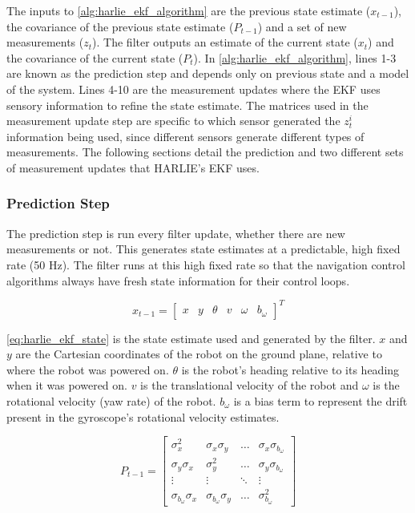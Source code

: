 The inputs to \autoref{alg:harlie_ekf_algorithm} are the previous state estimate ($x_{t-1}$), the covariance of the previous state estimate ($P_{t-1}$) and a set of new measurements ($z_t$). The filter outputs an estimate of the current state ($x_t$) and the covariance of the current state ($P_t$). In \autoref{alg:harlie_ekf_algorithm}, lines 1-3 are known as the prediction step and depends only on previous state and a model of the system. Lines 4-10 are the measurement updates where the EKF uses sensory information to refine the state estimate. The matrices used in the measurement update step are specific to which sensor generated the $z^i_t$ information being used, since different sensors generate different types of measurements. The following sections detail the prediction and two different sets of measurement updates that HARLIE's EKF uses.

\subsubsection{Prediction Step}\label{subsubsec:harlie_ekf_prediction}

The prediction step is run every filter update, whether there are new measurements or not. This generates state estimates at a predictable, high fixed rate (50 Hz). The filter runs at this high fixed rate so that the navigation control algorithms always have fresh state information for their control loops.

\begin{equation}
	x_{t-1} = 
	\begin{bmatrix}
		x &
		y &
		\theta &
		v &
		\omega &
		b_{\omega}
	\end{bmatrix}^T
	\label{eq:harlie_ekf_state}
\end{equation}

\eqref{eq:harlie_ekf_state} is the state estimate used and generated by the filter. $x$ and $y$ are the Cartesian coordinates of the robot on the ground plane, relative to where the robot was powered on. $\theta$ is the robot's heading relative to its heading when it was powered on. $v$ is the translational velocity of the robot and $\omega$ is the rotational velocity (yaw rate) of the robot. $b_{\omega}$ is a bias term to represent the drift present in the gyroscope's rotational velocity estimates.

\begin{equation}
	P_{t-1} =
	\begin{bmatrix}
		\sigma_x^2 & \sigma_x\sigma_y & \ldots & \sigma_x\sigma_{b_{\omega}} \\
		\sigma_y\sigma_x & \sigma_y^2 & \ldots & \sigma_y\sigma_{b_{\omega}} \\
		\vdots & \vdots & \ddots & \vdots \\
		\sigma_{b_{\omega}}\sigma_x & \sigma_{b_{\omega}}\sigma_y & 
			\ldots & \sigma_{b_{\omega}}^2
	\end{bmatrix}
	\label{eq:harlie_ekf_state_covariance}
\end{equation}

